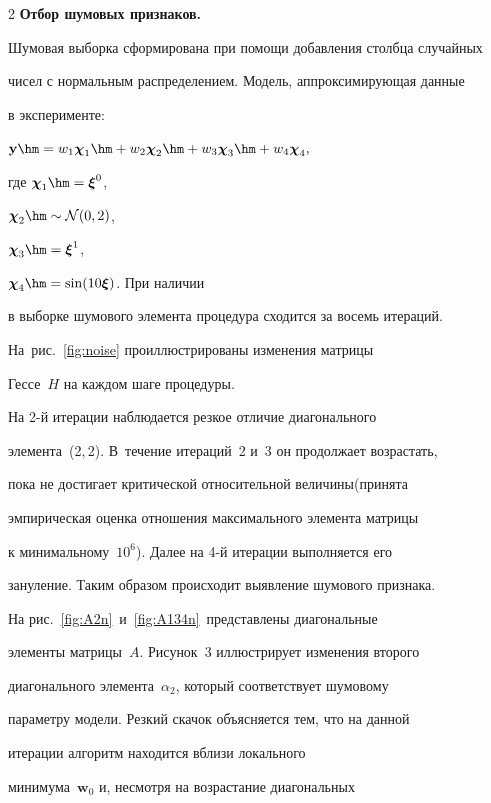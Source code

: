 \begin{multicols}{2}
\textbf{Отбор шумовых признаков.}

Шумовая выборка сформирована при помощи добавления столбца случайных

чисел с нормальным распределением. Модель, аппроксимирующая данные

в эксперименте:

$\mathbf{y}\hm=w_{1}\boldsymbol{\chi}_{1}\hm+w_{2}\boldsymbol{\chi}_{2}

\hm +w_{3}\boldsymbol{\chi}_{3}\hm+w_{4}\boldsymbol{\chi}_{4},$

где $\boldsymbol{\chi}_1\hm=\boldsymbol{\xi}^0$,

$\boldsymbol{\chi}_2\hm\sim\mathcal{N}(0,2)$,

$\boldsymbol{\chi}_3\hm=\boldsymbol{\xi}^1$,

$\boldsymbol{\chi}_4\hm=\sin(10\boldsymbol{\xi})$. При наличии

в выборке шумового элемента процедура сходится за восемь итераций.

На~рис.~\ref{fig:noise} про\-ил\-люст\-ри\-ро\-ва\-ны изменения матрицы

Гессе~$H$ на каждом шаге процедуры.





На 2-й итерации наблюдается резкое отличие диагонального

элемента~(2,\,2). В~течение итераций~2 и~3 он продолжает возрастать,

пока не достигает критической относительной величины\linebreak (принята

эмпирическая оценка отношения максимального элемента матрицы

к минимальному~$10^6$). Далее на 4-й итерации выполняется его

зануление. Таким образом происходит выявление шумового приз\-нака.



На рис.~\ref{fig:A2n}~и~\ref{fig:A134n}~представлены диагональные

элементы матрицы~$A$. Рисунок~3 иллюстрирует изменения второго

диагонального элемента~$\alpha_2$, который соответствует шумовому

параметру модели. Резкий скачок объясняется тем, что на данной

итерации алгоритм находится вблизи локального

минимума~$\mathbf{w}_0$ и, несмотря на возрастание диагональных


\end{multicols}
